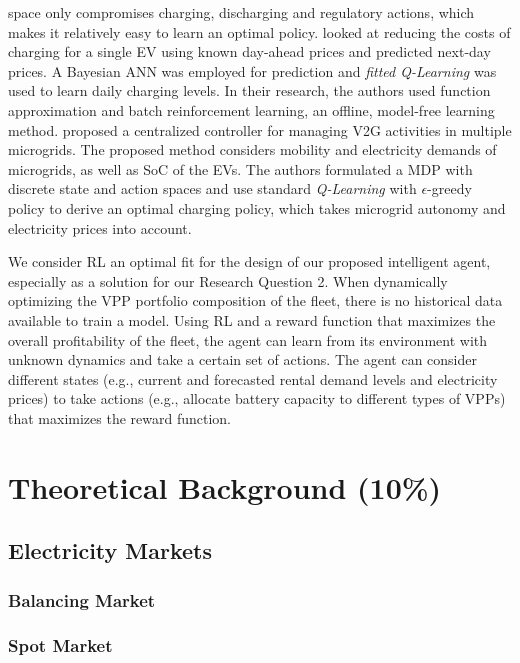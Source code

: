 \documentclass[12pt, article]{article}
\begin{document}
space only compromises charging, discharging and regulatory actions, which makes
it relatively easy to learn an optimal policy.
\textcite{chis16_reinf_learn_based_plug_in} looked at reducing the costs of charging
for a single EV using known day-ahead prices and predicted next-day prices. A
Bayesian ANN was employed for prediction and \emph{fitted Q-Learning} was used to
learn daily charging levels. In their research, the authors used function
approximation and batch reinforcement learning, an offline, model-free learning
method. \textcite{ko18_mobil_aware_vehic_to_grid} proposed a centralized
controller for managing V2G activities in multiple microgrids. The proposed
method considers mobility and electricity demands of microgrids, as well as SoC
of the EVs. The authors formulated a MDP with discrete state and action spaces
and use standard \emph{Q-Learning} with \(\epsilon\)-greedy policy to derive an optimal
charging policy, which takes microgrid autonomy and electricity prices into
account.


\parencite{vazquez-canteli19_reinf_learn_deman_respon}

We consider RL an optimal fit for the design of our proposed intelligent agent,
especially as a solution for our Research Question 2. When dynamically
optimizing the VPP portfolio composition of the fleet, there is no historical
data available to train a model. Using RL and a reward function that maximizes
the overall profitability of the fleet, the agent can learn from its environment
with unknown dynamics and take a certain set of actions. The agent can consider
different states (e.g., current and forecasted rental demand levels and
electricity prices) to take actions (e.g., allocate battery capacity to
different types of VPPs) that maximizes the reward function.


\section{Theoretical Background (10\%)}
\label{sec:org4d3a0e6}
\subsection{Electricity Markets}
\label{sec:org2602bf2}
\subsubsection{Balancing Market}
\label{sec:org9fd5e9a}
\subsubsection{Spot Market}
\label{sec:org275c7b2}
\end{document}
